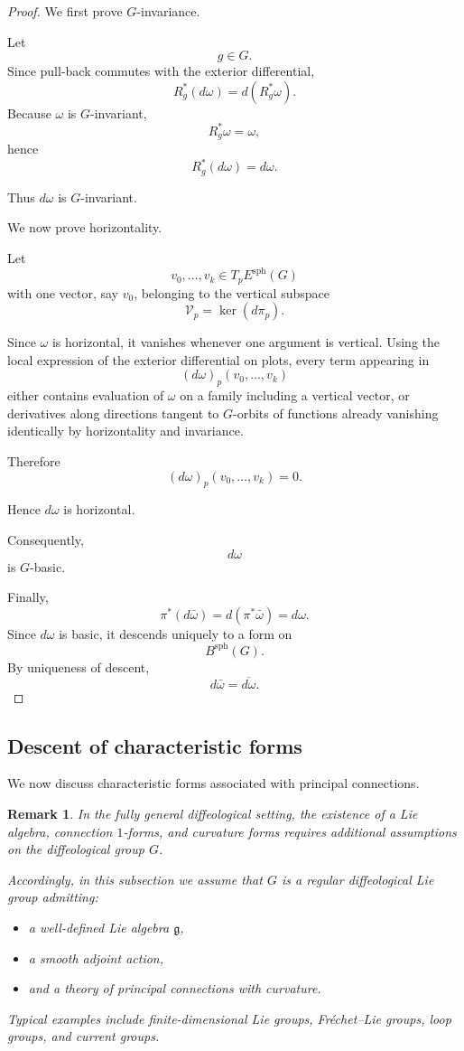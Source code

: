 \documentclass[11pt]{amsart}
\newtheorem{remark}[definition]{Remark}
\begin{document}
\begin{proof}
We first prove \(G\)-invariance.

Let
\[
g\in G.
\]
Since pull-back commutes with the exterior differential,
\[
R_g^*(d\omega)
=
d(R_g^*\omega).
\]
Because \(\omega\) is \(G\)-invariant,
\[
R_g^*\omega=\omega,
\]
hence
\[
R_g^*(d\omega)=d\omega.
\]

Thus \(d\omega\) is \(G\)-invariant.

We now prove horizontality.

Let
\[
v_0,\dots,v_k
\in
T_pE^{\mathrm{sph}}(G)
\]
with one vector, say \(v_0\), belonging to the vertical subspace
\[
\mathcal V_p=\ker(d\pi_p).
\]

Since \(\omega\) is horizontal, it vanishes whenever one argument is vertical.
Using the local expression of the exterior differential on plots, every term
appearing in
\[
(d\omega)_p(v_0,\dots,v_k)
\]
either contains evaluation of \(\omega\) on a family including a vertical
vector, or derivatives along directions tangent to \(G\)-orbits of functions
already vanishing identically by horizontality and invariance.

Therefore
\[
(d\omega)_p(v_0,\dots,v_k)=0.
\]

Hence \(d\omega\) is horizontal.

Consequently,
\[
d\omega
\]
is \(G\)-basic.

Finally,
\[
\pi^*(d\bar\omega)
=
d(\pi^*\bar\omega)
=
d\omega.
\]
Since \(d\omega\) is basic, it descends uniquely to a form on
\[
B^{\mathrm{sph}}(G).
\]
By uniqueness of descent,
\[
d\bar\omega
=
\overline{d\omega}.
\]
\end{proof}

\subsection{Descent of characteristic forms}

We now discuss characteristic forms associated with principal connections.

\begin{remark}
In the fully general diffeological setting, the existence of a Lie algebra,
connection \(1\)-forms, and curvature forms requires additional assumptions on
the diffeological group \(G\).

Accordingly, in this subsection we assume that \(G\) is a regular
diffeological Lie group admitting:
\begin{itemize}
\item a well-defined Lie algebra \(\mathfrak g\),
\item a smooth adjoint action,
\item and a theory of principal connections with curvature.
\end{itemize}
Typical examples include finite-dimensional Lie groups, Fréchet--Lie groups,
loop groups, and current groups.
\end{remark}
\end{document}
